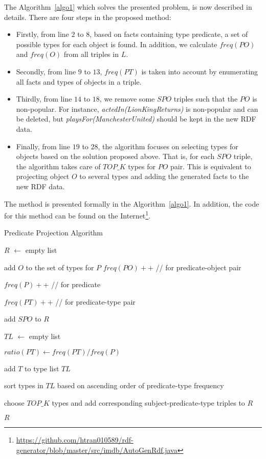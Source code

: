 \documentclass{acm_proc_article-sp}
\begin{document}
The Algorithm~\ref{algo1} which solves the presented problem, is now described in details. There are four steps in the proposed method:
\begin{itemize}
\item Firstly, from line $2$ to $8$, based on facts containing type predicate, a set of possible types for each object is found. In addition, we calculate $freq(PO)$ and $freq(O)$ from all triples in $L$.
\item Secondly, from line $9$ to $13$, $freq(PT)$ is taken into account by enumerating all facts and types of objects in a triple.
\item Thirdly, from line $14$ to $18$, we remove some $SPO$ triples such that the $PO$ is non-popular. For instance, \textit{actedIn(LionKingReturns)} is non-popular and can be deleted, but \textit{playsFor(ManchesterUnited)} should be kept in the new RDF data.
\item Finally, from line $19$ to $28$, the algorithm focuses on selecting types for objects based on the solution proposed above. That is, for each $SPO$ triple, the algorithm takes care of $TOP\_K$ types for $PO$ pair. This is equivalent to projecting object $O$ to several types and adding the generated facts to the new RDF data.
\end{itemize}

The method is presented formally in the Algorithm~\ref{algo1}. In addition, the code for this method can be found on the Internet\footnote{\url{https://github.com/htran010589/rdf-generator/blob/master/src/imdb/AutoGenRdf.java}}.

\begin{algorithm}
\label{algo1}
\caption{Predicate Projection Algorithm}

\SetAlgoLined
{}
$R$ $\leftarrow$ empty list

 {
	 {
		add $O$ to the set of types for $P$
	}
	$freq(PO)++$  //  for predicate-object pair

	$freq(P)++$  //  for predicate
}

 {
	 {
		$freq(PT)++$  //  for predicate-type pair
	}
}

 {
	 {
		add $SPO$ to $R$
	}
}
 {

	$TL$ $\leftarrow$ empty list

	 {
		$ratio(PT) \leftarrow freq(PT) / freq(P)$

		 {
			add $T$ to type list $TL$
		}
	}
	sort types in $TL$ based on ascending order of predicate-type frequency

	choose $TOP\_K$ types and add corresponding subject-predicate-type triples to $R$

}

\Return $R$

\end{algorithm}
\end{document}
